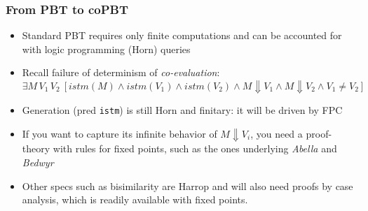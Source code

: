 \documentclass{beamer}
\newcommand{\red}[1]{{\color{red} #1}}
\begin{document}

\begin{frame}
  \frametitle{From PBT to coPBT}
  \begin{itemize}
  \item Standard PBT requires only finite computations and can be accounted for with logic programming (Horn) queries
  \item Recall failure of determinism of \emph{co-evaluation}:
    $\exists M\, V_1\, V_2\ [istm(M) \land istm( V_1) \land istm(V_2) \land M\Downarrow V_1\land M\Downarrow V_2 \land V_1 \not = V_2 ]$
    \pause
    \item Generation (pred \texttt{istm}) is still Horn and finitary: it will be driven by FPC
      
    \item If you want to capture its
      \red{infinite} behavior of  $ M\Downarrow V_i$, you need a proof-theory with rules for
      fixed points, such as the ones underlying \emph{Abella} and
      \emph{Bedwyr}%
    \item Other specs such as bisimilarity are Harrop and will also need proofs by \red{case analysis}, which is readily available with fixed points.

  \end{itemize}
\end{frame}
\end{document}
